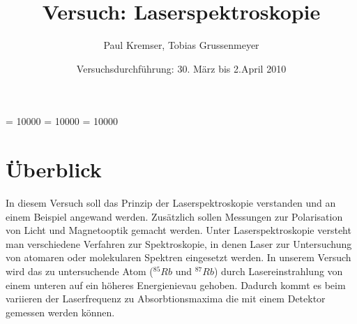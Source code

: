 \documentclass[12pt]{article}
\newcommand{\changefont}[3]{
\fontfamily{#1} \fontseries{#2} \fontshape{#3} \selectfont}
\begin{document}
\clubpenalty = 10000
\widowpenalty = 10000 
\displaywidowpenalty = 10000

\onehalfspacing
\changefont{ptm}{m}{n} 

\begin{titlepage}
\author{Paul Kremser, Tobias Grussenmeyer}
\title{Versuch: Laserspektroskopie}
\date{Versuchsdurchführung: 30. März bis 2.April 2010} 
\maketitle
\thispagestyle{empty}
\end{titlepage}

\tableofcontents
\thispagestyle{empty}
\newpage
{}
\section{Überblick}
In diesem Versuch soll das Prinzip der Laserspektroskopie verstanden und an einem Beispiel angewand werden. Zusätzlich sollen Messungen zur Polarisation von
Licht und Magnetooptik gemacht werden.
Unter Laserspektroskopie versteht man verschiedene Verfahren zur Spektroskopie, in denen Laser zur Untersuchung von atomaren oder molekularen Spektren eingesetzt werden. 
In unserem Versuch wird das zu untersuchende Atom ($^{85}Rb$ und $^{87}Rb$) durch Lasereinstrahlung von einem unteren auf ein höheres Energienievau gehoben.
Dadurch kommt es beim variieren der Laserfrequenz zu Absorbtionsmaxima die mit einem Detektor gemessen werden können.
\newpage
\end{document}
